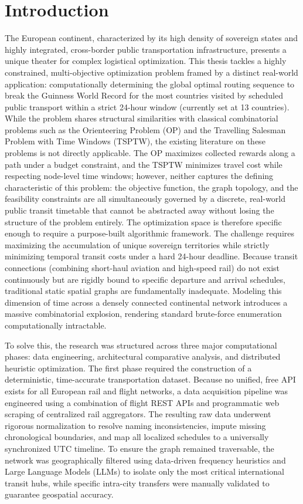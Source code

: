 \chapter{Introduction}

The European continent, characterized by its high density of sovereign states and highly integrated, cross-border public transportation infrastructure, presents a unique theater for complex logistical optimization. This thesis tackles a highly constrained, multi-objective optimization problem framed by a distinct real-world application: computationally determining the global optimal routing sequence to break the Guinness World Record for the most countries visited by scheduled public transport within a strict 24-hour window (currently set at 13 countries). While the problem shares structural similarities with classical combinatorial problems such as the Orienteering Problem (OP) and the Travelling Salesman Problem with Time Windows (TSPTW), the existing literature on these problems is not directly applicable. The OP maximizes collected rewards along a path under a budget constraint, and the TSPTW minimizes travel cost while respecting node-level time windows; however, neither captures the defining characteristic of this problem: the objective function, the graph topology, and the feasibility constraints are all simultaneously governed by a discrete, real-world public transit timetable that cannot be abstracted away without losing the structure of the problem entirely. The optimization space is therefore specific enough to require a purpose-built algorithmic framework. The challenge requires maximizing the accumulation of unique sovereign territories while strictly minimizing temporal transit costs under a hard 24-hour deadline. Because transit connections (combining short-haul aviation and high-speed rail) do not exist continuously but are rigidly bound to specific departure and arrival schedules, traditional static spatial graphs are fundamentally inadequate. Modeling this dimension of time across a densely connected continental network introduces a massive combinatorial explosion, rendering standard brute-force enumeration computationally intractable.

\medskip

To solve this, the research was structured across three major computational phases: data engineering, architectural comparative analysis, and distributed heuristic optimization. The first phase required the construction of a deterministic, time-accurate transportation dataset. Because no unified, free API exists for all European rail and flight networks, a data acquisition pipeline was engineered using a combination of flight REST APIs and programmatic web scraping of centralized rail aggregators. The resulting raw data underwent rigorous normalization to resolve naming inconsistencies, impute missing chronological boundaries, and map all localized schedules to a universally synchronized UTC timeline. To ensure the graph remained traversable, the network was geographically filtered using data-driven frequency heuristics and Large Language Models (LLMs) to isolate only the most critical international transit hubs, while specific intra-city transfers were manually validated to guarantee geospatial accuracy.

